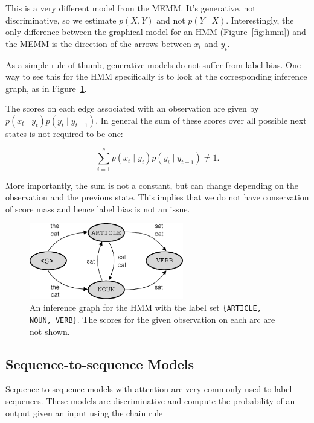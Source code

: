 \documentclass[11pt, letterpaper]{article}
\begin{document}
This is a very different model from the MEMM. It's generative, not
discriminative, so we estimate $p(X, Y)$ and not $p(Y \mid X)$. Interestingly,
the only difference between the graphical model for an HMM
(Figure~\ref{fig:hmm}) and the MEMM is the direction of the arrows between
$x_t$ and $y_t$.

As a simple rule of thumb, generative models do not suffer from label bias. One
way to see this for the HMM specifically is to look at the corresponding
inference graph, as in Figure~\ref{fig:hmm_inference}.

The scores on each edge associated with an observation are given by $p(x_t
\mid y_t) p(y_t \mid y_{t-1})$. In general the sum of these scores over all
possible next states is not required to be one:

\begin{equation}
\sum_{i=1}^c p(x_t \mid y_i) p(y_i \mid y_{t-1}) \ne 1.
\end{equation}

More importantly, the sum is not a constant, but can change depending on the
observation and the previous state. This implies that we do not have
conservation of score mass and hence label bias is not an issue.

\begin{figure}
    \centering
    \includegraphics[width=0.6\textwidth]{figures/hmm_inference.pdf}
    \caption{An inference graph for the HMM with the label set
    \texttt{\{ARTICLE, NOUN, VERB\}}. The scores for the given observation on
    each arc are not shown.}
    \label{fig:hmm_inference}
\end{figure}

\subsection{Sequence-to-sequence Models}

Sequence-to-sequence models with attention are very commonly used to label
sequences. These models are discriminative and compute the probability of an
output given an input using the chain rule
\end{document}
